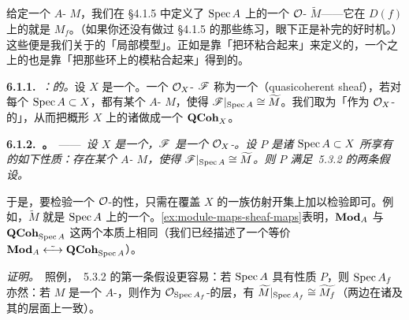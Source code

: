 
\section{\trQCSheaf}

给定一个 $A$-\trModule{} $M$，我们在 \S4.1.5 中定义了 $\operatorname{Spec} A$ 上的一个 $\mathcal{O}$-\trModule{} $\widetilde{M}$——它在 $D(f)$ 上的\trSection{}就是 $M_f$。（如果你还没有做过 \S4.1.5 的那些练习，眼下正是补完的好时机。）这些便是我们关于\trQCSheaf{}的「局部模型」。正如\trScheme{}是靠「把环粘合起来」来定义的，一个\trScheme{}之上的\trQCSheaf{}也是靠「把那些环上的模粘合起来」得到的。

\textbf{6.1.1.}\ \emph{\trhDefinition{}：\trQCSheaf{}的\trCategory。}\quad 设 $X$ 是一个\trScheme。一个 $\mathcal{O}_X$-\trModule{} $\mathscr{F}$ 称为一个\textbf{\trQCSheaf}（quasicoherent sheaf），若对每个\trAffine\trOpenSubset{} $\operatorname{Spec} A\subset X$，都有某个 $A$-\trModule{} $M$，使得 $\mathscr{F}|_{\operatorname{Spec} A}\cong\widetilde{M}$。我们取\trMorphism{}为「作为 $\mathcal{O}_X$-\trModule{}的\trMorphism」，从而把概形 $X$ 上的诸\trQCSheaf{}做成一个\trCategory{} $\mathbf{QCoh}_X$。

\textbf{6.1.2.\ \trhTheorem。}\ ——\ \emph{设 $X$ 是一个\trScheme，$\mathscr{F}$ 是一个 $\mathcal{O}_X$-\trModule。设 $P$ 是诸\trAffine\trOpenSubscheme{} $\operatorname{Spec} A\subset X$ 所享有的如下性质：存在某个 $A$-\trModule{} $M$，使得 $\mathscr{F}|_{\operatorname{Spec} A}\cong\widetilde{M}$。则 $P$ 满足\trAffineCommunicationLemma{}~5.3.2 的两条假设。}

于是，要检验一个 $\mathcal{O}$-\trModule{}的\trQC{}性，只需在覆盖 $X$ 的一族仿射开集上加以检验即可。例如，$\widetilde{M}$ 就是 $\operatorname{Spec} A$ 上的一个\trQCSheaf。\cref{ex:module-maps-sheaf-maps}表明，$\mathbf{Mod}_{A}$ 与 $\mathbf{QCoh}_{\operatorname{Spec} A}$ 这两个\trCategory{}本质上相同（我们已经描述了一个等价 $\mathbf{Mod}_{A}\;\tilde{\longleftrightarrow}\;\mathbf{QCoh}_{\operatorname{Spec} A}$）。

\emph{证明。}\ 照例，\trAffineCommunicationLemma{}~5.3.2 的第一条假设更容易：若 $\operatorname{Spec} A$ 具有性质 $P$，则\trDistinguishedOpen{} $\operatorname{Spec} A_f$ 亦然：若 $M$ 是一个 $A$-\trModule，则作为 $\mathcal{O}_{\operatorname{Spec} A_f}$-\trModule{}的层，有 $\widetilde{M}|_{\operatorname{Spec} A_f}\cong\widetilde{M_f}$（两边在诸\trDistinguishedOpen{}及其\trRestrictionMap{}的层面上一致）。

